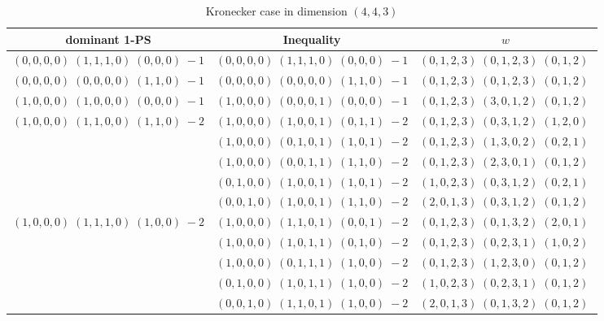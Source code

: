 \documentclass[11pt]{article}
\begin{document}
 
 \begin{longtable}[l]{|c|c|c|} 
 \caption{Kronecker case in dimension $(4,4,3)$} \\  
 
 \hline 
 \textrm{dominant 1-PS} & \textrm{Inequality} & $w$ \\ 
 \hline\multirow[t]{1}{*}{ $(0 ,0 ,0 ,0) \;(1 ,1 ,1 ,0) \;(0 ,0 ,0) \;-1$ }  & $(0 ,0 ,0 ,0) \;(1 ,1 ,1 ,0) \;(0 ,0 ,0) \;-1$ & $(0 ,1 ,2 ,3) \;(0 ,1 ,2 ,3) \;(0 ,1 ,2) \;$\\ \hline\multirow[t]{1}{*}{ $(0 ,0 ,0 ,0) \;(0 ,0 ,0 ,0) \;(1 ,1 ,0) \;-1$ }  & $(0 ,0 ,0 ,0) \;(0 ,0 ,0 ,0) \;(1 ,1 ,0) \;-1$ & $(0 ,1 ,2 ,3) \;(0 ,1 ,2 ,3) \;(0 ,1 ,2) \;$\\ \hline\multirow[t]{1}{*}{ $(1 ,0 ,0 ,0) \;(1 ,0 ,0 ,0) \;(0 ,0 ,0) \;-1$ }  & $(1 ,0 ,0 ,0) \;(0 ,0 ,0 ,1) \;(0 ,0 ,0) \;-1$ & $(0 ,1 ,2 ,3) \;(3 ,0 ,1 ,2) \;(0 ,1 ,2) \;$\\ \hline\multirow[t]{5}{*}{ $(1 ,0 ,0 ,0) \;(1 ,1 ,0 ,0) \;(1 ,1 ,0) \;-2$ }  & $(1 ,0 ,0 ,0) \;(1 ,0 ,0 ,1) \;(0 ,1 ,1) \;-2$ & $(0 ,1 ,2 ,3) \;(0 ,3 ,1 ,2) \;(1 ,2 ,0) \;$\\ 
 \cline{2-3} 
 & $(1 ,0 ,0 ,0) \;(0 ,1 ,0 ,1) \;(1 ,0 ,1) \;-2$ & $(0 ,1 ,2 ,3) \;(1 ,3 ,0 ,2) \;(0 ,2 ,1) \;$\\ 
 \cline{2-3} 
 & $(1 ,0 ,0 ,0) \;(0 ,0 ,1 ,1) \;(1 ,1 ,0) \;-2$ & $(0 ,1 ,2 ,3) \;(2 ,3 ,0 ,1) \;(0 ,1 ,2) \;$\\ 
 \cline{2-3} 
 & $(0 ,1 ,0 ,0) \;(1 ,0 ,0 ,1) \;(1 ,0 ,1) \;-2$ & $(1 ,0 ,2 ,3) \;(0 ,3 ,1 ,2) \;(0 ,2 ,1) \;$\\ 
 \cline{2-3} 
 & $(0 ,0 ,1 ,0) \;(1 ,0 ,0 ,1) \;(1 ,1 ,0) \;-2$ & $(2 ,0 ,1 ,3) \;(0 ,3 ,1 ,2) \;(0 ,1 ,2) \;$\\ \hline\multirow[t]{6}{*}{ $(1 ,0 ,0 ,0) \;(1 ,1 ,1 ,0) \;(1 ,0 ,0) \;-2$ }  & $(1 ,0 ,0 ,0) \;(1 ,1 ,0 ,1) \;(0 ,0 ,1) \;-2$ & $(0 ,1 ,2 ,3) \;(0 ,1 ,3 ,2) \;(2 ,0 ,1) \;$\\ 
 \cline{2-3} 
 & $(1 ,0 ,0 ,0) \;(1 ,0 ,1 ,1) \;(0 ,1 ,0) \;-2$ & $(0 ,1 ,2 ,3) \;(0 ,2 ,3 ,1) \;(1 ,0 ,2) \;$\\ 
 \cline{2-3} 
 & $(1 ,0 ,0 ,0) \;(0 ,1 ,1 ,1) \;(1 ,0 ,0) \;-2$ & $(0 ,1 ,2 ,3) \;(1 ,2 ,3 ,0) \;(0 ,1 ,2) \;$\\ 
 \cline{2-3} 
 & $(0 ,1 ,0 ,0) \;(1 ,0 ,1 ,1) \;(1 ,0 ,0) \;-2$ & $(1 ,0 ,2 ,3) \;(0 ,2 ,3 ,1) \;(0 ,1 ,2) \;$\\ 
 \cline{2-3} 
 & $(0 ,0 ,1 ,0) \;(1 ,1 ,0 ,1) \;(1 ,0 ,0) \;-2$ & $(2 ,0 ,1 ,3) \;(0 ,1 ,3 ,2) \;(0 ,1 ,2) \;$\\ 

\end{longtable}
\end{document}
